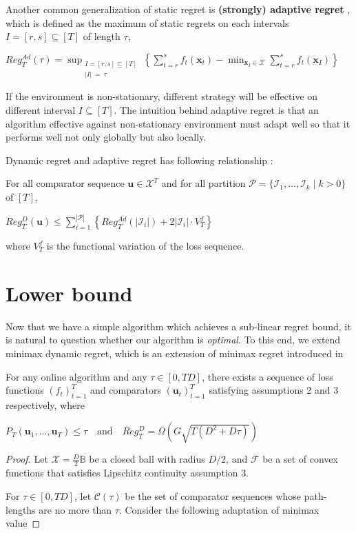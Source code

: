 \documentclass[12pt, a4paper]{report}
\begin{document}
\begin{rem}
Another common generalization of static regret is \textbf{(strongly) adaptive regret} \cite{Hazan2007AdaptiveAF, Hazan2009EfficientLA, Daniely2015StronglyAO}, which is defined as the maximum of static regrets on each intervals $I = [r, s] \subseteq [T]$ of length $\tau$,
\begin{center}
    $\displaystyle Reg_{T}^{Ad}(\tau) = \sup_{\substack{I=[r, s] \subseteq [T] \\ |I|\ =\ \tau}} \left\{\sum_{t=r}^s f_t(\mathbf{x}_t) - \min_{\mathbf{x}_I \in \mathcal{X}} \sum_{t=r}^s f_t(\mathbf{x}_I) \right\}$
\end{center}
If the environment is non-stationary, different strategy will be effective on different interval $I \subseteq [T]$.
The intuition behind adaptive regret is that an algorithm effective against non-stationary environment must adapt well so that it performs well not only globally but also locally.

Dynamic regret and adaptive regret has following relationship \cite[Theorem 3]{Zhang2018DynamicRO}:
\begin{prop}
For all comparator sequence $\mathbf{u} \in \mathcal{X}^T$ and for all partition $\mathcal{P} = \{ \mathcal{I}_1, \dots, \mathcal{I}_k \mid k > 0 \}$ of $[T]$,
\begin{center}
    $\displaystyle Reg_T^D(\mathbf{u}) \leq \sum_{i=1}^{|\mathcal{P}|} \left\{Reg_T^{Ad}\left(|\mathcal{I}_i|\right) + 2|\mathcal{I}_i| \cdot V_T^f \right\}$
\end{center}
where $V_T^f$ is the functional variation of the loss sequence. 
\end{prop}
\end{rem}
\section{Lower bound}
Now that we have a simple algorithm which achieves a sub-linear regret bound, it is natural to question whether our algorithm is \textit{optimal}. To this end, we extend minimax dynamic regret, which is an extension of minimax regret introduced in 
\begin{thm}
    For any online algorithm and any $\tau \in [0, TD]$, there exists a sequence of loss functions $(f_t)_{t=1}^{T}$ and comparators $(\mathbf{u}_t)_{t=1}^{T}$ satisfying assumptions 2 and 3 respectively, where
\begin{center}
    $P_T(\mathbf{u}_1, ..., \mathbf{u}_T) \leq \tau \quad \text{and} \quad Reg_T^{D} = \Omega(G\sqrt{T(D^2 + D\tau)})$
\end{center}
\end{thm}
\begin{proof}
Let $\mathcal{X} = \frac{D}{2}\mathbb{B}$ be a closed ball with radius $D/2$, and $\mathcal{F}$ be a set of convex functions that satisfies Lipschitz continuity assumption 3. 

For $\tau \in [0, TD]$, let $\mathcal{C}(\tau)$ be the set of comparator sequences whose path-lengths are no more than $\tau$. Consider the following adaptation of minimax value  
\end{proof}
\end{document}
